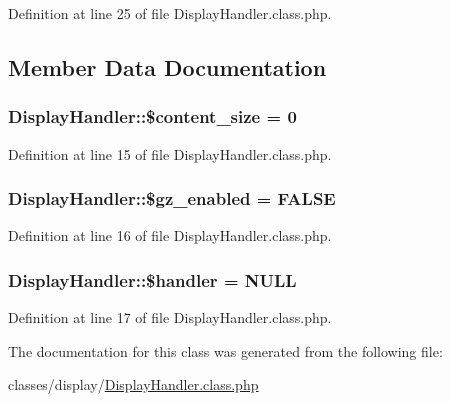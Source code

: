 Definition at line 25 of file Display\-Handler.\-class.\-php.



\subsection{Member Data Documentation}
\hypertarget{classDisplayHandler_a16976f3c3f4d8e587c113278731a5562}{
\subsubsection[{\$content\-\_\-size}]{\setlength{\rightskip}{0pt plus 5cm}Display\-Handler\-::\$content\-\_\-size = 0}}\label{classDisplayHandler_a16976f3c3f4d8e587c113278731a5562}


Definition at line 15 of file Display\-Handler.\-class.\-php.

\hypertarget{classDisplayHandler_a15d342938e38ae003b61d9437a43d3dc}{
\subsubsection[{\$gz\-\_\-enabled}]{\setlength{\rightskip}{0pt plus 5cm}Display\-Handler\-::\$gz\-\_\-enabled = F\-A\-L\-S\-E}}\label{classDisplayHandler_a15d342938e38ae003b61d9437a43d3dc}


Definition at line 16 of file Display\-Handler.\-class.\-php.

\hypertarget{classDisplayHandler_a5bba2765a13e36d9e147424338fb2a92}{
\subsubsection[{\$handler}]{\setlength{\rightskip}{0pt plus 5cm}Display\-Handler\-::\$handler = N\-U\-L\-L}}\label{classDisplayHandler_a5bba2765a13e36d9e147424338fb2a92}


Definition at line 17 of file Display\-Handler.\-class.\-php.



The documentation for this class was generated from the following file\-:\begin{DoxyCompactItemize}
\item 
classes/display/\hyperlink{DisplayHandler_8class_8php}{Display\-Handler.\-class.\-php}\end{DoxyCompactItemize}
